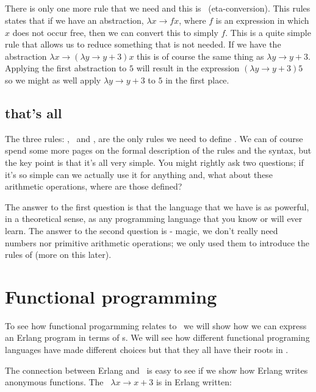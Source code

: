 \documentclass[a4paper,11pt]{article}
\begin{document}
\subsection{\etac}

There is only one more rule that we need and this is \etac\
(eta-conversion). This rules states that if we have an abstraction,
$\lambda x \rightarrow f x$, where $f$ is an expression in which $x$
does not occur free, then we can convert this to simply $f$. This is a
quite simple rule that allows us to reduce something that is not
needed. If we have the abstraction
$\lambda x \rightarrow (\lambda y \rightarrow y + 3) x$ this is of
course the same thing as $\lambda y \rightarrow y + 3$.  Applying the
first abstraction to $5$ will result in the expression
$(\lambda y \rightarrow y + 3) 5$ so we might as well apply
$\lambda y \rightarrow y + 3$ to $5$ in the first place.

\subsection{that's all}

The three rules: \alphac, \betar\ and \etac, are the only rules we
need to define \lamc. We can of course spend some more pages on the
formal description of the rules and the syntax, but the key point is
that it's all very simple. You might rightly ask two questions; if
it's so simple can we actually use it for anything and, what about
these arithmetic operations, where are those defined? 

The answer to the first question is that the language that we have is
as powerful, in a theoretical sense, as any programming language that
you know or will ever learn. The answer to the second question is -
magic, we don't really need numbers nor primitive arithmetic
operations; we only used them to introduce the rules of \lamc (more on
this later).

\section{Functional programming}

To see how functional progarmming relates to \lamc\ we will show how
we can express an Erlang program in terms of \lame s. We will see how
different functional programing languages have made different choices
but that they all have their roots in \lamc.

The connection between Erlang and \lamc\ is easy to see if we show how
Erlang writes anonymous functions. The \lama\
$\lambda x \rightarrow x + 3$ is in Erlang written:
\end{document}
